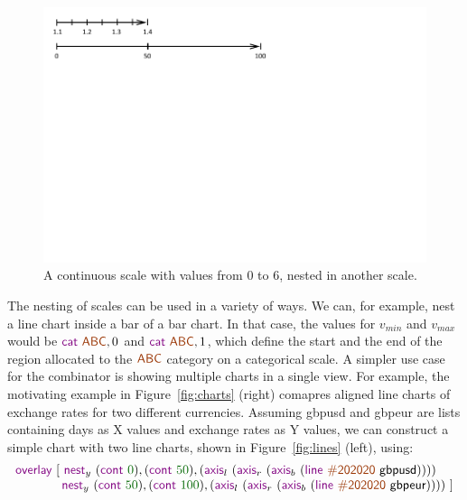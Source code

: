 \documentclass{jfp}
\newcommand{\num}[1]{\textcolor{numclr}{#1}}
\newcommand{\strf}[1]{\textnormal{\textcolor{strclr}{\sffamily #1}}}
\newcommand{\ident}[1]{\textnormal{\textcolor{idclr}{\sffamily #1}}}
\newcommand{\kvd}[1]{\textnormal{\textcolor{kvdclr}{\sffamily #1}}}
\begin{document}
\begin{figure}
\includegraphics[scale=1,trim={0cm 7.5cm 6cm 0cm},clip]{figures/nest}
\caption{A continuous scale with values from $0$ to $6$, nested in another scale.}
\label{fig:nesting}
\end{figure}

The nesting of scales can be used in a variety of ways. We can, for example, nest a line chart
inside a bar of a bar chart. In that case, the values for $v_{min}$ and $v_{max}$ would be
$\kvd{cat}~\strf{ABC}, 0$ and $\kvd{cat}~\strf{ABC}, 1$, which define the start and the end of
the region allocated to the $\strf{ABC}$ category on a categorical scale. A simpler use case for
the combinator is showing multiple charts in a single view. For example, the motivating example
in Figure~\ref{fig:charts} (right) comapres aligned line charts of exchange rates for two
different currencies. Assuming \ident{gbpusd} and \ident{gbpeur} are lists containing days as X
values and exchange rates as Y values, we can construct a simple chart with two line charts,
shown in Figure~\ref{fig:lines} (left), using:
%
\begin{equation*}
\begin{array}{l}
\kvd{overlay}~[~
\kvd{nest}_y~(\kvd{cont}~\num{0}),(\kvd{cont}~\num{50}), (\kvd{axis}_l~(\kvd{axis}_r~(\kvd{axis}_b~(\kvd{line}~\strf{\#202020}~\ident{gbpusd}))))\\
\hspace{3.68em} \kvd{nest}_y~(\kvd{cont}~\num{50}),(\kvd{cont}~\num{100}), (\kvd{axis}_l~(\kvd{axis}_r~(\kvd{axis}_b~(\kvd{line}~\strf{\#202020}~\ident{gbpeur}))))~]\\
\end{array}
\end{equation*}
\end{document}
